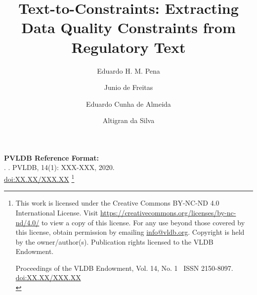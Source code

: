\documentclass[sigconf, nonacm]{acmart}
\newcommand\vldbdoi{XX.XX/XXX.XX}
\newcommand\vldbpages{XXX-XXX}
\newcommand\vldbvolume{14}
\newcommand\vldbissue{1}
\newcommand\vldbyear{2020}
\newcommand\vldbauthors{\authors}
\newcommand\vldbtitle{\shorttitle}
\newcommand\vldbpagestyle{plain}
\begin{document}
\title{Text-to-Constraints: Extracting Data Quality Constraints from Regulatory Text}

\author{Eduardo H. M. Pena}
  

\author{Junio de Freitas}

\author{Eduardo Cunha de Almeida}

\author{Altigran da Silva}



\begin{abstract}

\end{abstract}



\maketitle


\pagestyle{\vldbpagestyle}
\begingroup\small\noindent\raggedright\textbf{PVLDB Reference Format:}\\
\vldbauthors. \vldbtitle. PVLDB, \vldbvolume(\vldbissue): \vldbpages, \vldbyear.\\
\href{https://doi.org/\vldbdoi}{doi:\vldbdoi}
\endgroup
\begingroup
\renewcommand\thefootnote{}\footnote{\noindent
This work is licensed under the Creative Commons BY-NC-ND 4.0 International License. Visit \url{https://creativecommons.org/licenses/by-nc-nd/4.0/} to view a copy of this license. For any use beyond those covered by this license, obtain permission by emailing \href{mailto:info@vldb.org}{info@vldb.org}. Copyright is held by the owner/author(s). Publication rights licensed to the VLDB Endowment. \\
\raggedright Proceedings of the VLDB Endowment, Vol. \vldbvolume, No. \vldbissue\ %
ISSN 2150-8097. \\
\href{https://doi.org/\vldbdoi}{doi:\vldbdoi} \\
}\addtocounter{footnote}{-1}\endgroup
\end{document}
